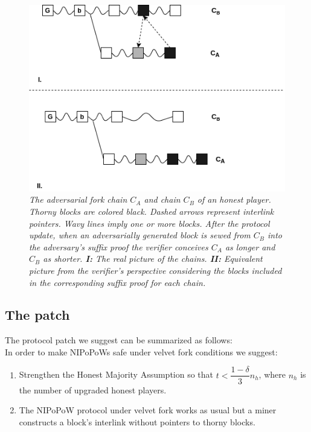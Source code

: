 \begin{figure}[h!]
	\begin{center}
		\includegraphics[scale=0.5]{figures/injection.png}
	\end{center}
	\caption{\textit{The adversarial fork chain $C_A$ and chain $C_B$ of an honest player. Thorny blocks are colored black. Dashed arrows represent interlink pointers. Wavy lines imply one or more blocks. After the protocol update, when an adversarially generated block is sewed from $C_B$ into the adversary's suffix proof the verifier conceives $C_A$ as longer and $C_B$ as shorter. \textbf{I:} The real picture of the chains. \textbf{II:} Equivalent picture from the verifier's perspective considering the blocks included in the corresponding suffix proof for each chain.}}
	\label{fig:injection}
\end{figure}

\subsection{The patch}
The protocol patch we suggest can be summarized as follows:\\

In order to make NIPoPoWs safe under velvet fork conditions we suggest:
\begin{enumerate}
\item Strengthen the Honest Majority Assumption so that $t < \dfrac{1 - \delta}{3}n_h$, where $n_h$ is the number of upgraded honest players.
\item The NIPoPoW protocol under velvet fork works as usual but a miner constructs a block's interlink without pointers to thorny blocks.
\end{enumerate}

